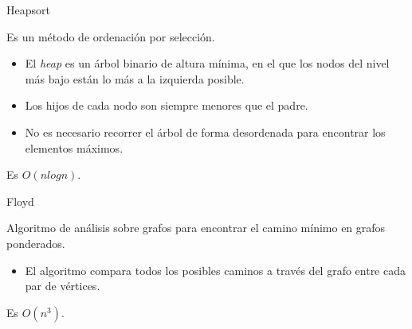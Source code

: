 \documentclass[spanish]{beamer}
\begin{document}
\begin{frame}{Heapsort}

	Es un método de ordenación por selección.

	\vskip 0.5cm
	
	\begin{itemize}
		\item El \textit{heap} es un árbol binario de altura mínima, en el que los nodos del nivel más bajo están lo más a la izquierda posible.
		\item Los hijos de cada nodo son siempre menores que el padre.
		\item No es necesario recorrer el árbol de forma desordenada para encontrar los elementos máximos.
	\end{itemize}
	
	\vskip 0.5cm
	
	Es $O(nlogn)$.
\end{frame}


\begin{frame}
	\begin{center}
		
	\end{center}
\end{frame}

\begin{frame}{Floyd}

	Algoritmo de análisis sobre grafos para encontrar el camino mínimo en grafos ponderados.

	\vskip 0.5cm
	
	\begin{itemize}
		\item El algoritmo compara todos los posibles caminos a través del grafo entre cada par de vértices.
	\end{itemize}
	
	\vskip 0.5cm
	
	Es $O(n^3)$.
\end{frame}

\begin{frame}
	\begin{center}
		
	\end{center}
\end{frame}
\end{document}
